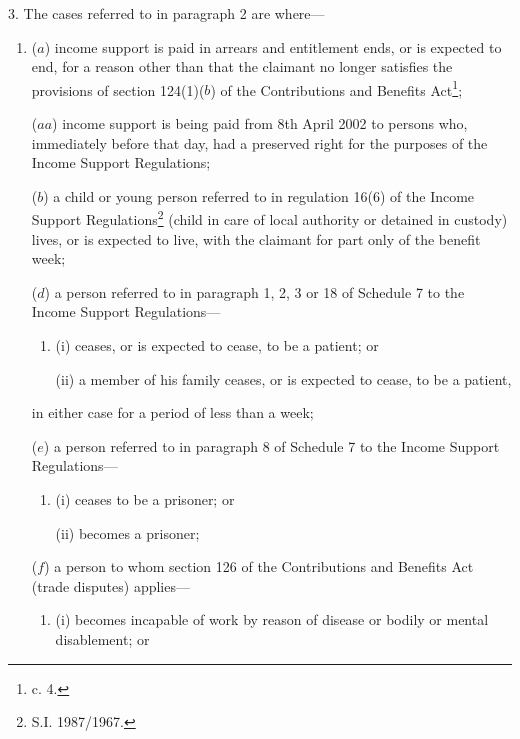 \documentclass[12pt,a4paper]{article}
\begin{document}
3.  The cases referred to in paragraph 2 are where—
\begin{enumerate}\item[]
($a$) income support is paid in arrears and entitlement ends, or is expected to end, for a reason other than that the claimant no longer satisfies the provisions of section 124(1)($b$)  of the Contributions and Benefits Act\footnote{ c. 4.};

($aa$) income support is being paid from 8th April 2002 to persons who, immediately before that day, had a preserved right for the purposes of the Income Support Regulations;

($b$) a child or young person referred to in regulation 16(6) of the Income Support Regulations\footnote{\frenchspacing S.I. 1987/1967.} (child in care of local authority or detained in custody) lives, or is expected to live, with the claimant for part only of the benefit week;


($d$) a person referred to in paragraph 1, 2, 3 or 18 of Schedule 7 to the Income Support Regulations—
\begin{enumerate}\item[]
(i) ceases, or is expected to cease, to be a patient; or

(ii) a member of his family ceases, or is expected to cease, to be a patient,
\end{enumerate}
in either case for a period of less than a week;

($e$) a person referred to in paragraph 8 of Schedule 7 to the Income Support Regulations—
\begin{enumerate}\item[]
(i) ceases to be a prisoner; or

(ii) becomes a prisoner;
\end{enumerate}

($f$) a person to whom section 126 of the Contributions and Benefits Act (trade disputes) applies—
\begin{enumerate}\item[]
(i) becomes incapable of work by reason of disease or bodily or mental disablement; or


\end{enumerate}
\end{enumerate}
\end{document}
